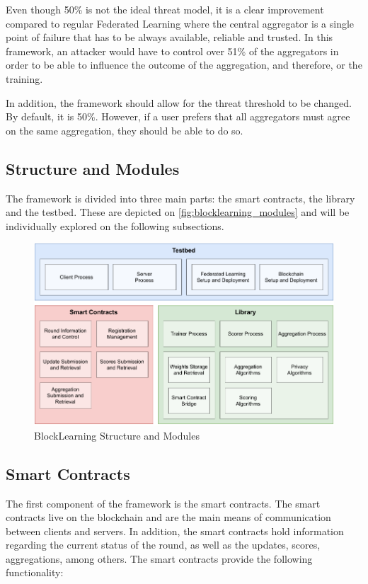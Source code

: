 Even though 50\% is not the ideal threat model, it is a clear improvement compared to regular Federated Learning where the central aggregator is a single point of failure that has to be always available, reliable and trusted. In this framework, an attacker would have to control over 51\% of the aggregators in order to be able to influence the outcome of the aggregation, and therefore, or the training.

In addition, the framework should allow for the threat threshold to be changed. By default, it is 50\%. However, if a user prefers that all aggregators must agree on the same aggregation, they should be able to do so.

\subsection{Structure and Modules}\label{meth:struct_modules}

The framework is divided into three main parts: the smart contracts, the library and the testbed. These are depicted on \autoref{fig:blocklearning_modules} and will be individually explored on the following subsections.

\begin{figure}[!ht]
    \centering
    \includegraphics[width=1\textwidth]{graphics/modules.pdf}
    \caption{BlockLearning Structure and Modules}
    \label{fig:blocklearning_modules}
\end{figure}

\subsection{Smart Contracts}\label{meth:smart_contracts}

The first component of the framework is the smart contracts. The smart contracts live on the blockchain and are the main means of communication between clients and servers. In addition, the smart contracts hold information regarding the current status of the round, as well as the updates, scores, aggregations, among others. The smart contracts provide the following functionality:


